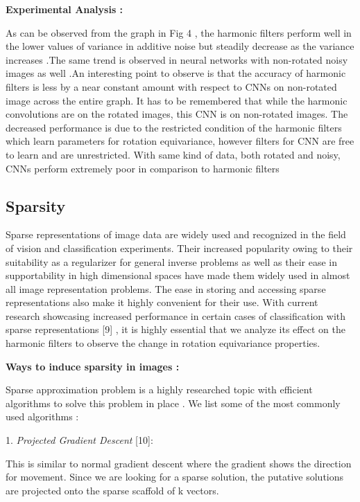 \documentclass{article}
\begin{document}
\textbf{Experimental Analysis :}

As can be observed from the graph in Fig 4 , the harmonic filters perform well in the lower values of variance in additive noise but steadily decrease as the variance increases .The same trend is observed in neural networks with non-rotated noisy images as well .An interesting point to observe is that the accuracy of harmonic filters is less by a near constant amount with respect to CNNs on non-rotated image across the entire graph. It has to be remembered that while the harmonic convolutions are on the rotated images, this CNN is on non-rotated images. The decreased performance is due to the restricted condition of the harmonic filters which learn parameters for rotation equivariance, however filters for CNN are free to learn and are unrestricted.
With same kind of data, both rotated and noisy, CNNs perform extremely poor in comparison to harmonic filters

\subsection{Sparsity}

Sparse representations of image data are widely used and recognized in the field of vision and classification experiments. Their increased popularity owing to their suitability as a regularizer for general inverse problems as well as their ease in supportability in high dimensional spaces have made them widely used in almost all image representation problems. The ease in storing and accessing sparse representations also make it highly convenient for their use. With current research showcasing increased performance in certain cases of classification with sparse representations [9] , it is highly essential that we analyze its effect on the harmonic filters to observe the change in rotation equivariance properties.

\textbf{Ways to induce sparsity in images :}

Sparse approximation problem is a highly researched topic with efficient algorithms to solve this problem in place . We list some of the most commonly used algorithms :

1.	\emph{Projected Gradient Descent} [10]: 

This is similar to normal gradient descent where the gradient shows the direction for movement. Since we are looking for a sparse solution, the putative solutions are projected onto the sparse scaffold of k vectors.
\end{document}
